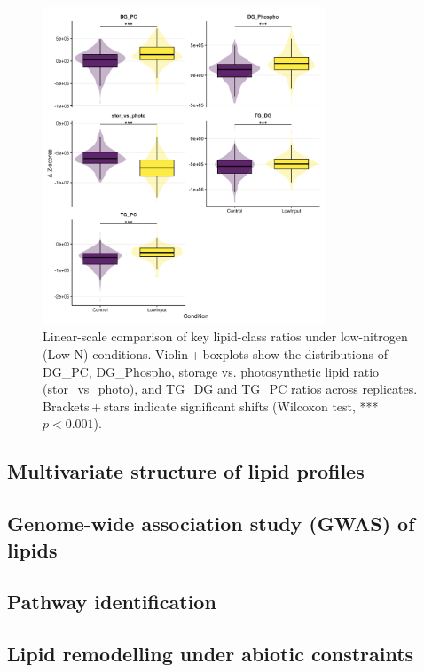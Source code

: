 \documentclass[10pt,letterpaper]{article}
\begin{document}
\begin{figure}[htbp]
  \centering
  \includegraphics[width=0.75\textwidth]{fig/main/Fig2b_lipid_ratio_linear_lowN.png}
  \caption{Linear-scale comparison of key lipid-class ratios under low-nitrogen (Low N) conditions.  Violin + boxplots show the distributions of DG\_PC, DG\_Phospho, storage vs. photosynthetic lipid ratio (stor\_vs\_photo), and TG\_DG and TG\_PC ratios across replicates.  Brackets + stars indicate significant shifts (Wilcoxon test, *** $p<0.001$).}
  \label{fig:2b_ratio_lowN}
\end{figure}


\subsection*{Multivariate structure of lipid profiles}

\subsection*{Genome-wide association study (GWAS) of lipids}

\subsection*{Pathway identification}

\subsection*{Lipid remodelling under abiotic constraints}
\end{document}
